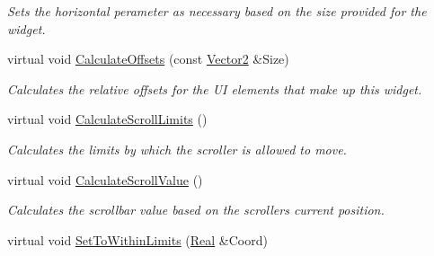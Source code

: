 \begin{DoxyCompactItemize}
\begin{DoxyCompactList}\small\item\em Sets the horizontal perameter as necessary based on the size provided for the widget. \item\end{DoxyCompactList}\item 
\hypertarget{classphys_1_1UI_1_1Scrollbar_a4621d6713a059196f1a358a23b9ad5ae}{
virtual void \hyperlink{classphys_1_1UI_1_1Scrollbar_a4621d6713a059196f1a358a23b9ad5ae}{CalculateOffsets} (const \hyperlink{classphys_1_1Vector2}{Vector2} \&Size)}
\label{classphys_1_1UI_1_1Scrollbar_a4621d6713a059196f1a358a23b9ad5ae}

\begin{DoxyCompactList}\small\item\em Calculates the relative offsets for the UI elements that make up this widget. \item\end{DoxyCompactList}\item 
\hypertarget{classphys_1_1UI_1_1Scrollbar_aa59e2c0662ac13fac037164c86f829f5}{
virtual void \hyperlink{classphys_1_1UI_1_1Scrollbar_aa59e2c0662ac13fac037164c86f829f5}{CalculateScrollLimits} ()}
\label{classphys_1_1UI_1_1Scrollbar_aa59e2c0662ac13fac037164c86f829f5}

\begin{DoxyCompactList}\small\item\em Calculates the limits by which the scroller is allowed to move. \item\end{DoxyCompactList}\item 
\hypertarget{classphys_1_1UI_1_1Scrollbar_afc9eb290c8dcf3935e2b3046063989e9}{
virtual void \hyperlink{classphys_1_1UI_1_1Scrollbar_afc9eb290c8dcf3935e2b3046063989e9}{CalculateScrollValue} ()}
\label{classphys_1_1UI_1_1Scrollbar_afc9eb290c8dcf3935e2b3046063989e9}

\begin{DoxyCompactList}\small\item\em Calculates the scrollbar value based on the scrollers current position. \item\end{DoxyCompactList}\item 
\hypertarget{classphys_1_1UI_1_1Scrollbar_a2048345c29ba15b8820971492f2bdea1}{
virtual void \hyperlink{classphys_1_1UI_1_1Scrollbar_a2048345c29ba15b8820971492f2bdea1}{SetToWithinLimits} (\hyperlink{namespacephys_af7eb897198d265b8e868f45240230d5f}{Real} \&Coord)}
\label{classphys_1_1UI_1_1Scrollbar_a2048345c29ba15b8820971492f2bdea1}


\end{DoxyCompactItemize}
